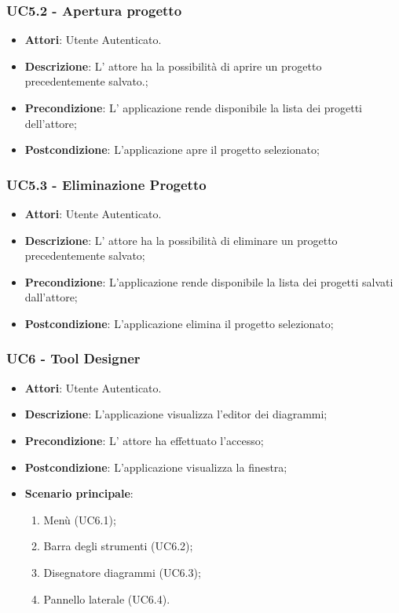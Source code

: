 \subsubsection{UC5.2 - Apertura progetto} 
\label{sssec:UC5.2} 
\begin{itemize} 
\item \textbf{Attori}: Utente Autenticato.
\item \textbf{Descrizione}: L’ attore ha la possibilità di aprire un progetto precedentemente salvato.;
\item \textbf{Precondizione}: L’ applicazione rende disponibile la lista dei progetti dell'attore;
\item \textbf{Postcondizione}: L’applicazione apre il progetto selezionato;
\end{itemize} 
\subsubsection{UC5.3 - Eliminazione Progetto} 
\label{sssec:UC5.3} 
\begin{itemize} 
\item \textbf{Attori}: Utente Autenticato.
\item \textbf{Descrizione}: L' attore ha la possibilità di eliminare un progetto precedentemente salvato;
\item \textbf{Precondizione}: L’applicazione rende disponibile la lista dei progetti salvati dall'attore;
\item \textbf{Postcondizione}: L’applicazione elimina il progetto selezionato;
\end{itemize} 
\subsubsection{UC6 - Tool Designer} 
\label{sssec:UC6} 
\begin{itemize} 
\item \textbf{Attori}: Utente Autenticato.
\item \textbf{Descrizione}: L'applicazione visualizza l'editor dei diagrammi;
\item \textbf{Precondizione}: L' attore ha effettuato l'accesso;
\item \textbf{Postcondizione}: L'applicazione visualizza la finestra;
\item \textbf{Scenario principale}: \begin{enumerate}\item Menù (UC6.1);\item Barra degli strumenti (UC6.2);\item Disegnatore diagrammi (UC6.3);\item Pannello laterale (UC6.4). 
 \end{enumerate}
\end{itemize} 
